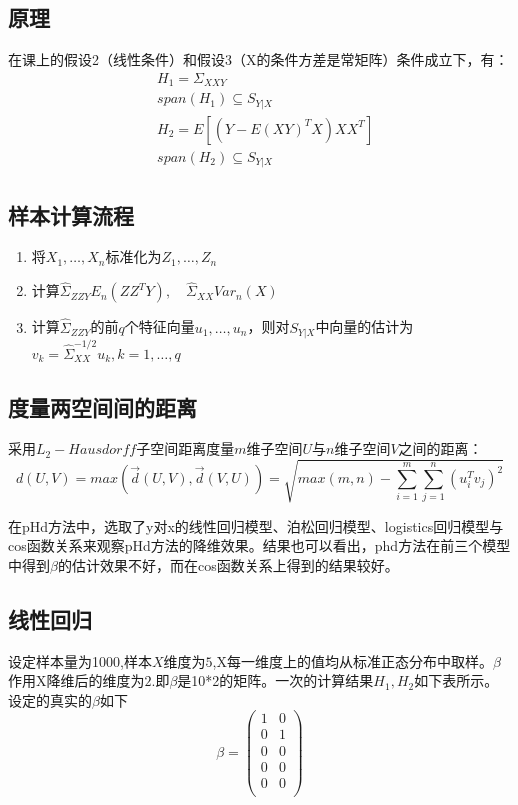 \subsection{原理}
在课上的假设2（线性条件）和假设3（X的条件方差是常矩阵）条件成立下，有：
\begin{align*}
    &H_1 = \Sigma_{XXY}  \\
    &span(H_1) \subseteq S_{Y|X} \\
    &H_2 = E[(Y-E(XY)^TX)XX^T] \\
    &span(H_2) \subseteq S_{Y|X}
\end{align*}
\subsection{样本计算流程}
\begin{enumerate}
    \item 将$X_1,\dots,X_n$标准化为$Z_1,\dots,Z_n$
    \item 计算$\hat{\Sigma}_{ZZY}E_n(ZZ^TY),\quad \hat{\Sigma}_{XX}Var_n(X)$
    \item 计算$\hat{\Sigma}_{ZZY}$的前$q$个特征向量$u_1,\dots,u_n$，则对$S_{Y|X}$中向量的估计为$v_k=\hat{\Sigma}_{XX}^{-1/2}u_k,k=1,\dots,q$
\end{enumerate}

\subsection{度量两空间间的距离}
采用$L_2-Hausdorff$子空间距离度量$m$维子空间$U$与$n$维子空间$V$之间的距离：
$$d(U,V)=max(\vec{d}(U,V),\vec{d}(V,U))=\sqrt{max(m,n)-\sum_{i=1}^m\sum_{j=1}^n(u_i^Tv_j)^2}$$

在pHd方法中，选取了y对x的线性回归模型、泊松回归模型、logistics回归模型与cos函数关系来观察pHd方法的降维效果。结果也可以看出，phd方法在前三个模型中得到$\beta$的估计效果不好，而在cos函数关系上得到的结果较好。
\subsection{线性回归}
设定样本量为1000,样本$X$维度为$5$,X每一维度上的值均从标准正态分布中取样。$\beta$作用X降维后的维度为$2$.即$\beta$是10*2的矩阵。一次的计算结果$H_1,H_2$如下表所示。设定的真实的$\beta$如下
\begin{equation}       %
   \beta= \left(                 %
      \begin{array}{cc}   %
        1 & 0 \\  %
        0 & 1 \\  %
        0 & 0 \\
        0 & 0 \\
        0 & 0 \\
      \end{array}
    \right)                 %
\end{equation}

